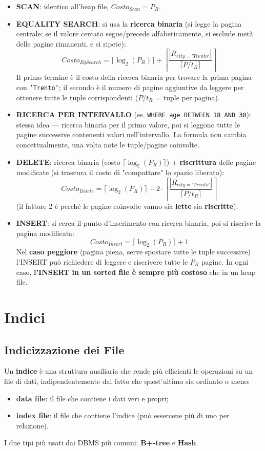 \documentclass[12pt, a4paper]{article}
\begin{document}
\begin{itemize}
    \item \textbf{SCAN}: identico all'heap file, $Costo_{Scan}=P_R$.
    \item \textbf{EQUALITY SEARCH}: si usa la \textbf{ricerca binaria} (si legge la pagina centrale; se il valore cercato segue/precede alfabeticamente, si esclude metà delle pagine rimanenti, e si ripete):
    $$Costo_{EqSearch} = \lceil \log_2(P_R) \rceil + \left\lceil \frac{|R_{city='Trento'}|}{\lceil P/t_R \rceil} \right\rceil$$
    Il primo termine è il costo della ricerca binaria per trovare la prima pagina con \texttt{'Trento'}; il secondo è il numero di pagine aggiuntive da leggere per ottenere tutte le tuple corrispondenti ($P/t_R$ = tuple per pagina).
    \item \textbf{RICERCA PER INTERVALLO} (es. \texttt{WHERE age BETWEEN 18 AND 30}): stessa idea — ricerca binaria per il primo valore, poi si leggono tutte le pagine successive contenenti valori nell'intervallo. La formula non cambia concettualmente, una volta note le tuple/pagine coinvolte.
    \item \textbf{DELETE}: ricerca binaria (costo $\lceil\log_2(P_R)\rceil$) + \textbf{riscrittura} delle pagine modificate (si trascura il costo di "compattare" lo spazio liberato):
    $$Costo_{Delete} = \lceil \log_2(P_R) \rceil + 2 \cdot \left\lceil \frac{|R_{city='Trento'}|}{\lceil P/t_R \rceil} \right\rceil$$
    (il fattore 2 è perché le pagine coinvolte vanno sia \textbf{lette} sia \textbf{riscritte}).
    \item \textbf{INSERT}: si cerca il punto d'inserimento con ricerca binaria, poi si riscrive la pagina modificata:
    $$Costo_{Insert} = \lceil \log_2(P_R) \rceil + 1$$
    Nel \textbf{caso peggiore} (pagina piena, serve spostare tutte le tuple successive) l'INSERT può richiedere di leggere e riscrivere tutte le $P_R$ pagine. In ogni caso, \textbf{l'INSERT in un sorted file è sempre più costoso} che in un heap file.
\end{itemize}

\section{Indici}

\subsection{Indicizzazione dei File}
Un \textbf{indice} è una struttura ausiliaria che rende più efficienti le operazioni su un file di dati, indipendentemente dal fatto che quest'ultimo sia ordinato o meno:
\begin{itemize}
    \item \textbf{data file}: il file che contiene i dati veri e propri;
    \item \textbf{index file}: il file che contiene l'indice (può essercene più di uno per relazione).
\end{itemize}
I due tipi più usati dai DBMS più comuni: \textbf{B+-tree} e \textbf{Hash}.
\end{document}
